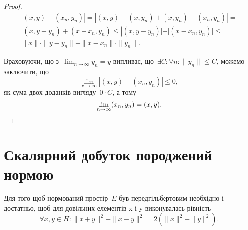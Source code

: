 \begin{proof}
    \begin{multline*}
        |(x, y) - (x_n, y_n)| =
        |(x, y) - (x, y_n) + (x, y_n) - (x_n, y_n)| =  \\
        |(x, y - y_n) + (x - x_n, y_n) \le
        |(x, y - y_n)| + |(x - x_n, y_n)| \le \\
        \|x\| \cdot \|y - y_n\| + \|x - x_n\| \cdot \|y_n\|.
    \end{multline*}

    Враховуючи, що з~$\lim_{n \to \infty} y_n = y$ випливає, що~$\exists C: \forall n: \|y_n\| \le C$, можемо заключити, що
    \begin{equation*}
        \lim_{n \to \infty}  |(x, y) - (x_n, y_n)| \le 0,
    \end{equation*}
    як сума двох доданків вигляду~$0 \cdot C$, а тому
    \begin{equation*}
        \lim_{n \to \infty} (x_n, y_n) = (x, y). \qedhere
    \end{equation*}
\end{proof}

\section{Скалярний добуток породжений нормою}

\begin{proposition}
    Для того щоб нормований простір~$E$ був передгільбертовим необхідно і достатньо, щоб для довільних елементів x і y виконувалась рівність
    \begin{equation}
        \label{eq:16.1}
        \forall x, y \in H: \|x + y\|^2 + \|x - y\|^2 = 2 (\|x\|^2 + \|y\|^2).
    \end{equation}
\end{proposition}

